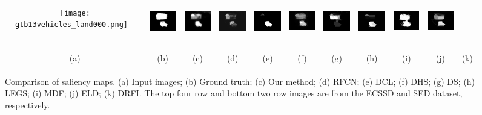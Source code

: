 \documentclass[10pt,twocolumn,letterpaper]{article}
\begin{document}
\begin{figure}
\begin{tabular}{@{}c@{}c@{}c@{}c@{}c@{}c@{}c@{}c@{}c@{}c@{}c}
\texttt{[image: gtb13vehicles\_land000.png]} \ &
\includegraphics[width=0.085\linewidth,height=1.25cm]{b13vehicles_land000_Amulet.png} \ &
\includegraphics[width=0.085\linewidth,height=1.25cm]{b13vehicles_land000_RFCN.jpg} \ &
\includegraphics[width=0.085\linewidth,height=1.25cm]{b13vehicles_land000_DCL.png} \ &
\includegraphics[width=0.085\linewidth,height=1.25cm]{b13vehicles_land000_DHS.png} \ &
\includegraphics[width=0.085\linewidth,height=1.25cm]{b13vehicles_land000_DS.png} \ &
\includegraphics[width=0.085\linewidth,height=1.25cm]{b13vehicles_land000_LEGS.png} \ &
\includegraphics[width=0.085\linewidth,height=1.25cm]{b13vehicles_land000_MDF.png} \ &
\includegraphics[width=0.085\linewidth,height=1.25cm]{b13vehicles_land000_ELD.png} \ &
\includegraphics[width=0.085\linewidth,height=1.25cm]{b13vehicles_land000_DRFI.png} \ \\
{\small (a)} & {\small(b)} & {\small(c)} & {\small(d)} & {\small(e)}& {\small(f)}& {\small(g)}
& {\small(h)}& {\small(i)}& {\small(j)}& {\small(k)} \\
\end{tabular}
\caption{Comparison of saliency maps. (a) Input images; (b) Ground truth; (c) Our method; (d) RFCN; (e) DCL; (f) DHS; (g) DS; (h) LEGS; (i) MDF; (j) ELD; (k) DRFI. The top four row and bottom two row images are from the ECSSD and SED dataset, respectively.
\label{fig:map_examples}}
\end{figure}
\end{document}
